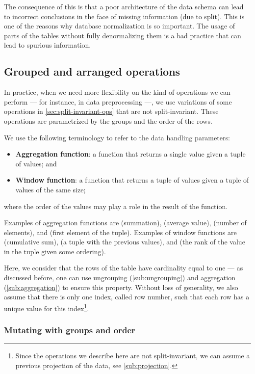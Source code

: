 The consequence of this is that a poor architecture of the data schema can lead to
incorrect conclusions in the face of missing information (due to split).  This is one of
the reasons why database normalization is so important.  The usage of parts of the tables
without fully denormalizing them is a bad practice that can lead to spurious information.

\subsection{Grouped and arranged operations}
\label{sub:grouped-arranged}

In practice, when we need more flexibility on the kind of operations we can perform ---
for instance, in data preprocessing ---, we use variations of some operations in
\cref{sec:split-invariant-ops} that are not split-invariant.  These operations are
parametrized by the groups and the order of the rows.

We use the following terminology to refer to the data handling parameters:
\begin{itemize}
  \itemsep0em
  \item \textbf{Aggregation function}: a function that returns a single value given a
    tuple of values; and
  \item \textbf{Window function}: a function that returns a tuple of values given a tuple
    of values of the same size;
\end{itemize}
where the order of the values may play a role in the result of the function.

Examples of aggregation functions are  (summation),  (average value),
 (number of elements), and  (first element of the tuple). Examples
of window functions are  (cumulative sum),  (a tuple with the
previous values), and  (the rank of the value in the tuple given some
ordering).

Here, we consider that the rows of the table have cardinality equal to one --- as
discussed before, one can use ungrouping (\cref{sub:ungrouping}) and aggregation
(\cref{sub:aggregation}) to ensure this property.  Without loss of generality, we also
assume that there is only one index, called row number, such that each row has a unique
value for this index\footnote{Since the operations we describe here are not
split-invariant, we can assume a previous projection of the data, see
\cref{sub:projection}.}.

\subsubsection{Mutating with groups and order}

